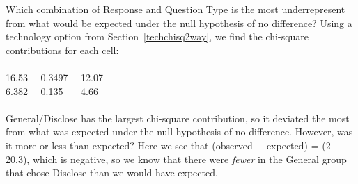 \begin{examplewrap}
\begin{nexample}{Which combination of Response and Question Type is the most underrepresent from what would be expected under the null hypothesis of no difference?  }
Using a technology option from Section~\ref{techchisq2way}, we find the chi-square contributions for each cell:\\ \\
16.53 \ \ 0.3497 \ \ 12.07\\
6.382 \ \ 0.135 \ \ \ 4.66\\ \\
General/Disclose has the largest chi-square contribution, so it deviated the most from what was expected under the null hypothesis of no difference.  However, was it more or less than expected?  Here we see that (observed $-$ expected) = (2 $-$ 20.3), which is negative, so we know that there were \emph{fewer} in the General group that chose Disclose than we would have expected.
\end{nexample}
\end{examplewrap}

